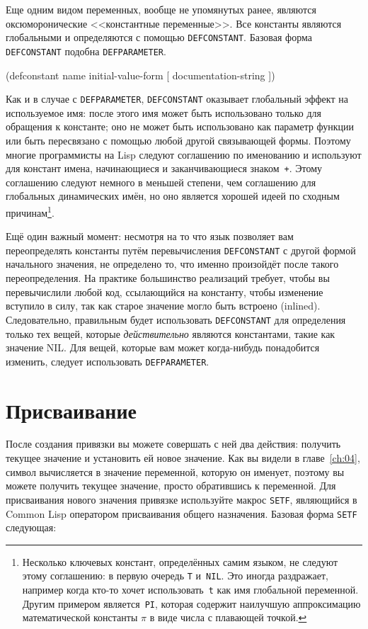Еще одним видом переменных, вообще не упомянутых ранее, являются оксюморонические
<<константные переменные>>. Все константы являются глобальными и определяются с помощью
\lstinline{DEFCONSTANT}. Базовая форма \lstinline{DEFCONSTANT} подобна \lstinline{DEFPARAMETER}.

\begin{myverb}
(defconstant name initial-value-form [ documentation-string ])
\end{myverb}

Как и в случае с \lstinline{DEFPARAMETER}, \lstinline{DEFCONSTANT} оказывает глобальный
эффект на используемое имя: после этого имя может быть использовано только для обращения к
константе; оно не может быть использовано как параметр функции или быть пересвязано с
помощью любой другой связывающей формы. Поэтому многие программисты на Lisp следуют
соглашению по именованию и используют для констант имена, начинающиеся и заканчивающиеся
знаком~\lstinline{+}. Этому соглашению следуют немного в меньшей степени, чем соглашению для
глобальных динамических имён, но оно является хорошей идеей по сходным
причинам\footnote{Несколько ключевых констант, определённых самим языком, не следуют этому
  соглашению: в первую очередь \lstinline{T} и~\lstinline{NIL}. Это иногда раздражает, например
  когда кто-то хочет использовать~\lstinline{t} как имя глобальной переменной. Другим примером
  является~\lstinline{PI}, которая содержит наилучшую аппроксимацию математической константы
  $\pi$ в виде числа с плавающей точкой.}.

Ещё один важный момент: несмотря на то что язык позволяет вам переопределять константы
путём перевычисления \lstinline{DEFCONSTANT} с другой формой начального значения, не
определено то, что именно произойдёт после такого переопределения. На практике
большинство реализаций требует, чтобы вы перевычислили любой код, ссылающийся на
константу, чтобы изменение вступило в силу, так как старое значение могло быть встроено
(inlined). Следовательно, правильным будет использовать \lstinline{DEFCONSTANT} для
определения только тех вещей, которые \textit{действительно} являются константами, такие
как значение NIL. Для вещей, которые вам может когда-нибудь понадобится изменить, следует
использовать \lstinline{DEFPARAMETER}.

\section{Присваивание}

После создания привязки вы можете совершать с ней два действия: получить текущее значение
и установить ей новое значение. Как вы видели в главе~\ref{ch:04}, символ вычисляется в
значение переменной, которую он именует, поэтому вы можете получить текущее значение,
просто обратившись к переменной. Для присваивания нового значения привязке используйте
макрос \lstinline{SETF}, являющийся в Common Lisp оператором присваивания общего назначения.
Базовая форма \lstinline{SETF} следующая:

